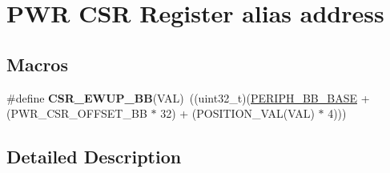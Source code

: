 \hypertarget{group___p_w_r___c_s_r__register__alias}{\section{P\-W\-R C\-S\-R Register alias address}
\label{group___p_w_r___c_s_r__register__alias}
}
\subsection*{Macros}
\begin{DoxyCompactItemize}
\item 
\hypertarget{group___p_w_r___c_s_r__register__alias_ga9c930c44a7e0d1c28f3c18641b94dbf2}{\#define {\bfseries C\-S\-R\-\_\-\-E\-W\-U\-P\-\_\-\-B\-B}(V\-A\-L)~((uint32\-\_\-t)(\hyperlink{group___peripheral__memory__map_gaed7efc100877000845c236ccdc9e144a}{P\-E\-R\-I\-P\-H\-\_\-\-B\-B\-\_\-\-B\-A\-S\-E} + (P\-W\-R\-\_\-\-C\-S\-R\-\_\-\-O\-F\-F\-S\-E\-T\-\_\-\-B\-B $\ast$ 32) + (P\-O\-S\-I\-T\-I\-O\-N\-\_\-\-V\-A\-L(V\-A\-L) $\ast$ 4)))}\label{group___p_w_r___c_s_r__register__alias_ga9c930c44a7e0d1c28f3c18641b94dbf2}

\end{DoxyCompactItemize}


\subsection{Detailed Description}
